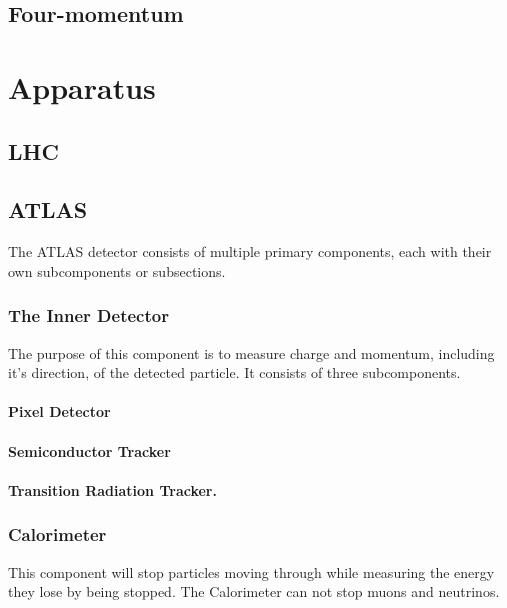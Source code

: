 \documentclass[11pt,a4paper]{article}
\begin{document}
\subsection{Four-momentum}

\section{Apparatus}

\subsection{LHC}

\subsection{ATLAS}


The ATLAS detector consists of multiple primary components, each with their own subcomponents or subsections.

\subsubsection{The Inner Detector}
The purpose of this component is to measure charge and momentum, including it's
direction, of the detected particle. It consists of three subcomponents.
\paragraph{Pixel Detector}
\paragraph{Semiconductor Tracker}
\paragraph{Transition Radiation Tracker.}

\subsubsection{Calorimeter}
This component will stop particles moving through while measuring the
energy they lose by being stopped. %
The Calorimeter can not stop muons and neutrinos.
\end{document}
